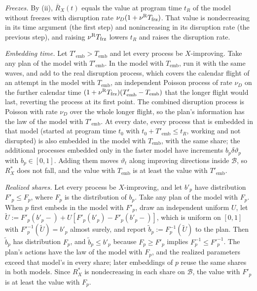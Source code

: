 \emph{Freezes.} By (ii), $\bar R_X(t)$ equals the value at program time $t_R$ of the model without freezes with disruption rate $\nu_D(1+\nu^{\rm R}T_{\rm frz})$. That value is nondecreasing in its time argument (the first step) and nonincreasing in its disruption rate (the previous step), and raising $\nu^{\rm R}T_{\rm frz}$ lowers $t_R$ and raises the disruption rate.

\emph{Embedding time.} Let $T'_{\mathrm{emb}}>T_{\mathrm{emb}}$ and let every process be $X$-improving. Take any plan of the model with $T'_{\mathrm{emb}}$. In the model with $T_{\mathrm{emb}}$, run it with the same waves, and add to the real disruption process, which covers the calendar flight of an attempt in the model with $T_{\mathrm{emb}}$, an independent Poisson process of rate $\nu_D$ on the further calendar time $(1+\nu^{\rm R}T_{\rm frz})(T'_{\mathrm{emb}}-T_{\mathrm{emb}})$ that the longer flight would last, reverting the process at its first point. The combined disruption process is Poisson with rate $\nu_D$ over the whole longer flight, so the plan's information has the law of the model with $T'_{\mathrm{emb}}$. At every date, every process that is embedded in that model (started at program time $t_0$ with $t_0+T'_{\mathrm{emb}}\le t_R$, working and not disrupted) is also embedded in the model with $T_{\mathrm{emb}}$, with the same share; the additional processes embedded only in the faster model have increments $b_p\delta\vartheta_p$ with $b_p\in[0,1]$. Adding them moves $\vartheta_t$ along improving directions inside $\mathcal B$, so $R^*_X$ does not fall, and the value with $T_{\mathrm{emb}}$ is at least the value with $T'_{\mathrm{emb}}$.

\emph{Realized shares.} Let every process be $X$-improving, and let $b'_p$ have distribution $F'_p\le F_p$, where $F_p$ is the distribution of $b_p$. Take any plan of the model with $F_p$. When $p$ first embeds in the model with $F'_p$, draw an independent uniform $U$, let $\tilde U:=F'_p(b'_p-)+U[F'_p(b'_p)-F'_p(b'_p-)]$, which is uniform on $[0,1]$ with $F'^{-1}_p(\tilde U)=b'_p$ almost surely, and report $\tilde b_p:=F^{-1}_p(\tilde U)$ to the plan. Then $\tilde b_p$ has distribution $F_p$, and $\tilde b_p\le b'_p$ because $F_p\ge F'_p$ implies $F^{-1}_p\le F'^{-1}_p$. The plan's actions have the law of the model with $F_p$, and the realized parameters exceed that model's in every share; later embeddings of $p$ reuse the same shares in both models. Since $R^*_X$ is nondecreasing in each share on $\mathcal B$, the value with $F'_p$ is at least the value with $F_p$.

